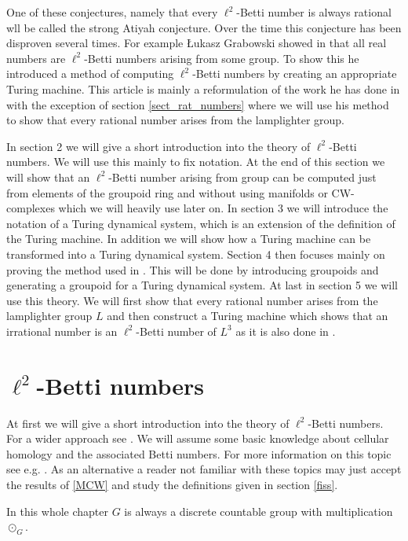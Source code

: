 \documentclass[12pt,a4paper]{scrartcl}
\theoremstyle{plain}
\theoremstyle{definition}
\newcommand{\2}{\mathbb{Z} / 2 \mathbb{Z}}
\newcommand{\1}{\bar{1}}
\newcommand{\0}{\bar{0}}
\begin{document}
One of these conjectures, namely that every $\ell^2$-Betti number is always rational wll be called the strong Atiyah conjecture. Over the time this conjecture has been disproven several times. For example \L ukasz Grabowski showed in \cite{GRAB} that all real numbers are $\ell^2$-Betti numbers arising from some group. To show this he introduced a method of computing $\ell^2$-Betti numbers by creating an appropriate Turing machine. This article is mainly a reformulation of the work he has done in \cite{GRAB} with the exception of section \ref{sect_rat_numbers} where we will use his method to show that every rational number arises from the lamplighter group.

In section 2 we will give a short introduction into the theory of $\ell^2$-Betti numbers. We will use this mainly to fix notation. At the end of this section we will show that an $\ell^2$-Betti number arising from group can be computed just from elements of the groupoid ring and without using manifolds or CW-complexes which we will heavily use later on. In section 3 we will introduce the notation of a Turing dynamical system, which is an extension of the definition of the Turing machine. In addition we will show how a Turing machine can be transformed into a Turing dynamical system. Section 4 then focuses mainly on proving the method used in \cite{GRAB}. This will be done by introducing groupoids and generating a groupoid for a Turing dynamical system. At last in section 5 we will use this theory. We will first show that every rational number arises from the lamplighter group $L$ and then construct a Turing machine which shows that an irrational number is an $\ell^2$-Betti number of $L^3$ as it is also done in \cite{GRAB}. 
\newpage

\section{$\ell^2$-Betti numbers}
At first we will give a short introduction into the theory of $\ell^2$-Betti numbers. For a wider approach see \cite{LUECK}. We will assume some basic knowledge about cellular homology and the associated Betti numbers. For more information on this topic see e.g. \cite{HATCH}. As an alternative a reader not familiar with these topics may just accept the results of \ref{MCW} and study the definitions given in section \ref{fiss}.

In this whole chapter $G$ is always a discrete countable group with multiplication $\odot_G$.
\end{document}
